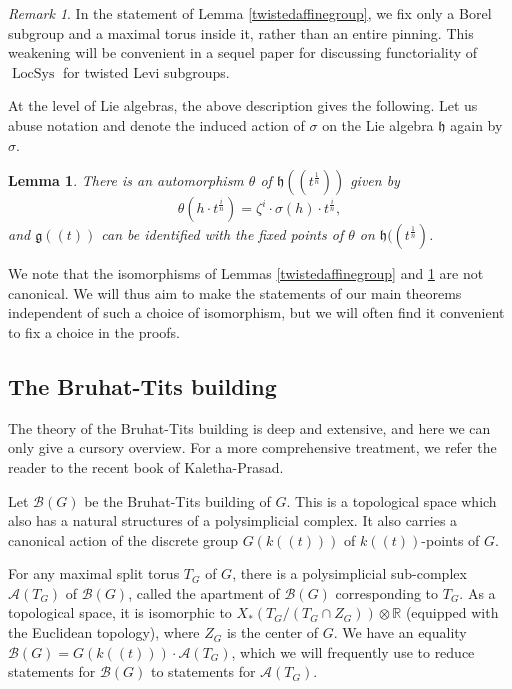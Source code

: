 \documentclass[12pt]{article}
\DeclareMathOperator{\LocSys}{LocSys}
\newtheorem{lemma}[theorem]{Lemma}
\theoremstyle{remark}
\newtheorem{remark}[theorem]{Remark}
\begin{document}
\begin{remark}
In the statement of Lemma \ref{twistedaffinegroup}, we fix only a Borel subgroup and a maximal torus inside it, rather than an entire pinning. This weakening will be convenient in a sequel paper for discussing functoriality of $\LocSys$ for twisted Levi subgroups.
\end{remark}

At the level of Lie algebras, the above description gives the following. Let us abuse notation and denote the induced action of $\sigma$ on the Lie algebra $\mathfrak{h}$ again by $\sigma$. 

\begin{lemma}\label{twistedaffine}
There is an automorphism $\theta$ of $\mathfrak{h}((t^{\frac{1}{n}}))$ given by
\[
\theta(h\cdot t^{\frac{i}{n}})=\zeta^{i}\cdot\sigma(h)\cdot t^{\frac{i}{n}},
\]
and $\mathfrak{g}((t))$ can be identified with the fixed points of $\theta$ on $\mathfrak{h}((t^{\frac{1}{n}})$.
\end{lemma}

We note that the isomorphisms of Lemmas \ref{twistedaffinegroup} and \ref{twistedaffine} are not canonical. We will thus aim to make the statements of our main theorems independent of such a choice of isomorphism, but we will often find it convenient to fix a choice in the proofs.

\subsection{The Bruhat-Tits building}\label{ss:building}

The theory of the Bruhat-Tits building is deep and extensive, and here we can only give a cursory overview. For a more comprehensive treatment, we refer the reader to the recent book \cite{kalethaprasad} of Kaletha-Prasad.

Let $\mathcal{B}(G)$ be the Bruhat-Tits building of $G$. This is a topological space which also has a natural structures of a polysimplicial complex. It also carries a canonical action of the discrete group $G(k((t)))$ of $k((t))$-points of $G$. 

For any maximal split torus $T_G$ of $G$, there is a polysimplicial sub-complex $\mathcal{A}(T_G)$ of $\mathcal{B}(G)$, called the apartment of $\mathcal{B}(G)$ corresponding to $T_G.$ As a topological space, it is isomorphic to $X_*(T_G/(T_G\cap Z_G))\otimes\mathbb{R}$ (equipped with the Euclidean topology), where $Z_G$ is the center of $G$. We have an equality $\mathcal{B}(G)=G(k((t)))\cdot\mathcal{A}(T_G)$, which we will frequently use to reduce statements for $\mathcal{B}(G)$ to statements for $\mathcal{A}(T_G)$.
\end{document}
